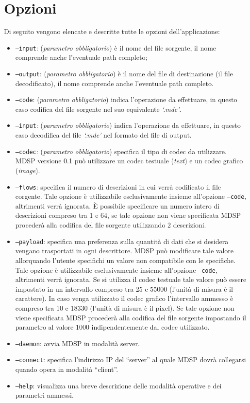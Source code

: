 \section{Opzioni}
\label{sec:opzioni}
Di seguito vengono elencate e descritte tutte le opzioni dell'applicazione:

\begin{itemize}
  \item \texttt{--input}: (\emph{parametro obbligatorio}) è il
  nome del file sorgente, il nome comprende anche l'eventuale path completo;
  \item \texttt{--output}: (\emph{parametro obbligatorio}) è il
  nome del file di destinazione (il file decodificato), il nome comprende anche l'eventuale path
  completo.
  \item \texttt{--code}: (\emph{parametro obbligatorio}) indica
  l'operazione da effettuare, in questo caso codifica del file sorgente nel suo equivalente
  \emph{`.mdc'}.
  \item \texttt{--input}: (\emph{parametro obbligatorio}) indica
  l'operazione da effettuare, in questo caso decodifica del file \emph{`.mdc'}
  nel formato del file di output.
  \item \texttt{--codec}: (\emph{parametro obbligatorio}) specifica il tipo di
  codec da utilizzare. MDSP versione 0.1 può utilizzare un codec testuale (\emph{text})
  e un codec grafico (\emph{image}).
  \item \texttt{--flows}: specifica il numero di descrizioni in cui verrà
  codificato il file corgente. Tale opzione è utilizzabile esclusivamente insieme all'opzione
  \texttt{--code}, altrimenti verrà ignorata. \`E possibile specificare un
  numero intero di descrizioni compreso tra 1 e 64, se tale opzione non viene
  specificata MDSP procederà alla codifica del file sorgente utilizzando 2
  descrizioni.
  \item \texttt{--payload}: specifica una preferenza sulla quantità di dati che
  si desidera vengano trasportati in ogni descrittore. MDSP può modificare tale
  valore allorquando l'utente specifichi un valore non compatibile con le
  specifiche. Tale opzione è utilizzabile esclusivamente insieme all'opzione
  \texttt{--code}, altrimenti verrà ignorata. Se si utilizza il codec testuale
  tale valore può essere impostato in un intervallo compreso tra 25 e 55000
  (l'unità di misura è il carattere). In caso venga utilizzato il codec grafico
  l'intervallo ammesso è compreso tra 10 e 18330 (l'unità di misura è il
  pixel). Se tale opzione non viene specificata MDSP procederà alla codifica
  del file sorgente impostando il parametro al valore 1000 indipendentemente dal codec utilizzato.
  \item \texttt{--daemon}: avvia MDSP in modalità server.
  \item \texttt{--connect}: specifica l'indirizzo IP del ``server'' al quale MDSP
  dovrà collegarsi quando opera in modalità ``client''.
  \item \texttt{--help}: visualizza una breve descrizione delle modalità
  operative e dei parametri ammessi.\\
\end{itemize}


